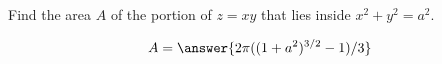 \documentclass{ximera}
\author{David Guichard \and Neal Koblitz \and H. Jerome Keisler \and Albert Scheller \and Barry Balof \and Mike Wills \and Matthew Carr}
\begin{document}
\begin{exercise}




Find the area $A$ of the portion of $z=xy$ that lies inside $x^2+y^2=a^2$.

\begin{prompt}
\[
A=\answer{2\pi((1+a^2)^{3/2}-1)/3}
\]
\end{prompt}


\end{exercise}
\end{document}
